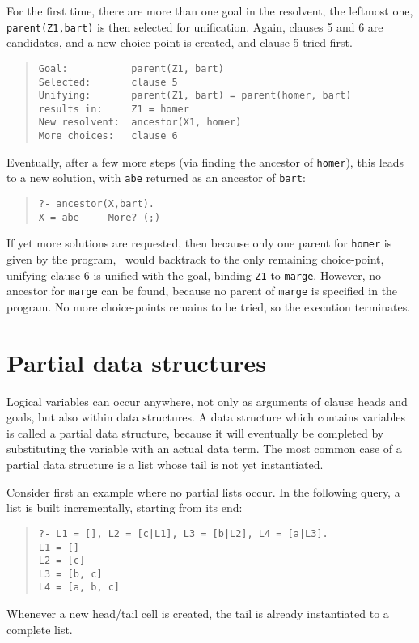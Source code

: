 For the first time, there are more than one goal in the resolvent, the
leftmost one, {\tt parent(Z1,bart)} is then
selected for unification. Again, clauses 5 and 6 are candidates, and
a new choice-point is created, and clause 5 tried first.
\begin{quote}\begin{verbatim}
Goal:           parent(Z1, bart)
Selected:       clause 5
Unifying:       parent(Z1, bart) = parent(homer, bart)
results in:     Z1 = homer
New resolvent:  ancestor(X1, homer)
More choices:   clause 6
\end{verbatim}\end{quote}
Eventually, after a few more steps
(via finding the ancestor of {\tt homer}), this leads to a new solution, 
with {\tt abe} returned as an ancestor of {\tt bart}:
\begin{quote}\begin{verbatim}
?- ancestor(X,bart).
X = abe     More? (;) 
\end{verbatim}\end{quote}
If yet more solutions are requested, then because only one parent for
{\tt homer} is given by the program, \eclipse\ would backtrack to the only 
remaining choice-point, unifying clause 6 is unified with the goal, 
binding \verb'Z1' to \verb'marge'. However, no ancestor for {\tt marge}
can be found, because no parent of
{\tt marge} is specified in the program. No more choice-points remains to
be tried, so the execution terminates.



\section{Partial data structures}
\label{tail}
Logical variables can occur anywhere, not only as arguments of clause
heads and goals, but also within data structures.
A data structure which contains variables is called a partial data
structure, because it will eventually be completed by substituting
the variable with an actual data term.
The most common case of a partial data structure is a list whose
tail is not yet instantiated.

Consider first an example where no partial lists occur.
In the following query, a list is built incrementally,
starting from its end:
\begin{quote}\begin{verbatim}
?- L1 = [], L2 = [c|L1], L3 = [b|L2], L4 = [a|L3].
L1 = []
L2 = [c]
L3 = [b, c]
L4 = [a, b, c]
\end{verbatim}\end{quote}
Whenever a new head/tail cell is created,
the tail is already instantiated to a complete list.

